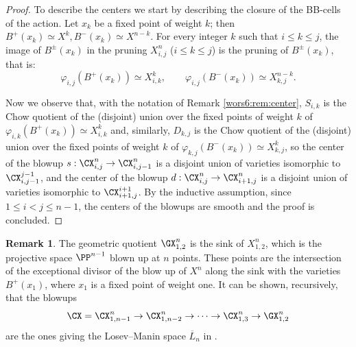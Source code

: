\documentclass[reqno]{amsproc}
\theoremstyle{definition}
\newtheorem{remark}[theorem]{Remark}
\begin{document}
\begin{proof}
To describe the centers we start by describing the closure of the BB-cells of the action. Let $x_k$ be a fixed point of weight $k$; then $B^+(x_k) \simeq X^k, B^-(x_k) \simeq X^{n-k}$.
For every integer $k$ such that $i\le k \le j$, the image of $B^\pm(x_k)$ in the pruning $X^n_{i,j}$ ($i\le k \le j$) is the pruning of $B^\pm(x_k)$,  that is:
\[
 \varphi_{i,j}(B^+(x_k)) \simeq X^{k}_{i,k}, \qquad \varphi_{i,j}(B^-(x_k)) \simeq  X^{n-k}_{k,j}.
\]

Now we observe that, with the notation of Remark \ref{wors6:rem:center},  $S_{i,k}$ is the Chow quotient of the (disjoint) union over the fixed points of weight $k$ of $\varphi_{i,k}(B^+(x_k)) \simeq X^k_{i,k}$ and, similarly, $D_{k,j}$ is the Chow quotient of the (disjoint) union over the fixed points of weight $k$ of $\varphi_{k,j}(B^-(x_k)) \simeq X^k_{k,j}$, so the center of the blowup $s:\CX^n_{i,j} \to \CX^n_{i,j-1}$ is  a disjoint union of varieties isomorphic to $\CX^{j-1}_{i,j-1}$, and the center of 
 the blowup $d:\CX^n_{i,j} \to \CX^n_{i+1,j}$ is a disjoint union of varieties isomorphic to $\CX^{i+1}_{i+1,j}$.
By the inductive assumption, since $1 \le i < j \le n-1$, the centers of the blowups are smooth and the proof is concluded.
\end{proof}

\begin{remark} The geometric quotient $\GX^n_{1,2}$ is the sink of $X^n_{1,2}$, which is the projective space $\PP^{n-1}$ blown up at $n$ points. These points are the intersection of the exceptional divisor of the blow up of $X^n$ along the sink with the varieties $B^+(x_1)$, where $x_1$ is a fixed point of weight one.
It can be shown, recursively, that the blowups 
\[\CX=\CX^n_{1,n-1} \to \CX^n_{1,n-2} \to \dots \to \CX^n_{1,3} \to \GX^n_{1,2}\]
are the ones giving the Losev--Manin space $\overline L_n$ in %
\cite[Section~6.1]{wors6-Hassett}.
\end{remark}




\end{document}
